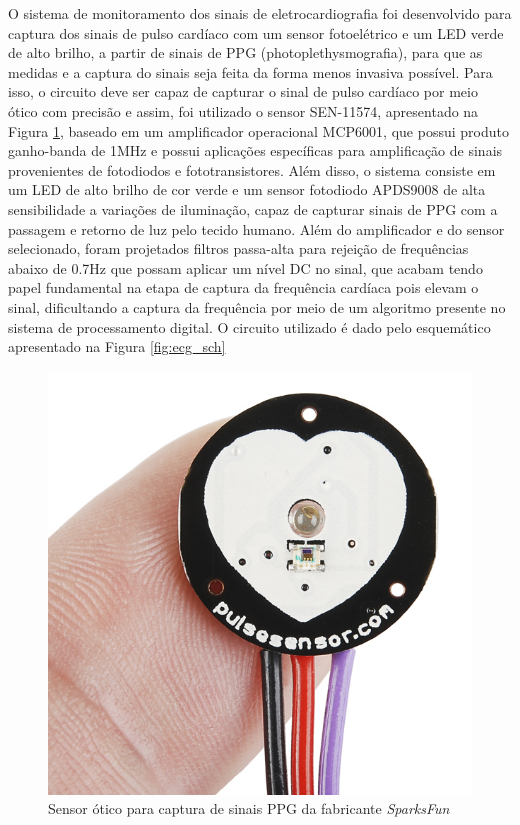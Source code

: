 O sistema de monitoramento dos sinais de eletrocardiografia 
foi desenvolvido para captura dos sinais de pulso cardíaco com um sensor 
fotoelétrico e um LED verde de alto brilho, a partir de sinais de PPG (photoplethysmografia), 
para que as medidas e a captura do sinais seja
feita da forma menos invasiva possível. Para isso, o circuito deve ser capaz de
capturar o sinal de pulso cardíaco por meio ótico com precisão e assim, foi 
utilizado o sensor SEN-11574, apresentado na Figura \ref{fig:ecg_circ}, 
baseado em um amplificador operacional MCP6001, 
que possui produto ganho-banda de 1MHz e possui aplicações específicas para 
amplificação de sinais provenientes de fotodiodos e fototransistores. Além disso, 
o sistema consiste em um LED de alto brilho de cor verde e um sensor fotodiodo 
APDS9008 de alta sensibilidade a variações de iluminação, capaz de capturar sinais 
de PPG com a passagem e retorno de luz pelo tecido humano.
Além do amplificador e do sensor selecionado, foram projetados filtros passa-alta para
rejeição de frequências abaixo de 0.7Hz que possam aplicar um nível DC no sinal,
que acabam tendo papel fundamental na etapa de captura da frequência cardíaca 
pois elevam o sinal, dificultando a captura da frequência por meio de um algoritmo 
presente no sistema de processamento digital. O circuito utilizado é dado pelo 
esquemático apresentado na Figura \ref{fig:ecg_sch}

\begin{figure}[h!]
    \begin{center}
        \includegraphics[scale=0.4]{figuras/ecg_circ.jpg}
    \end{center}
    \caption{Sensor ótico para captura de sinais PPG da fabricante \textit{SparksFun}}
    \label{fig:ecg_circ}
\end{figure}

